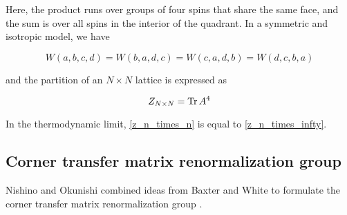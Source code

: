 Here, the product runs over groups of four spins that share the same face, and
the sum is over all spins in the interior of the quadrant.
In a symmetric and isotropic model, we have

\begin{equation}
  W(a, b, c, d) = W(b, a, d, c) = W(c, a, d, b) = W(d, c, b, a)
\end{equation}

and the partition of an $N \times N$ lattice is expressed as

\begin{equation}\label{z_n_times_n}
  Z_{N \times N} = \operatorname{Tr} A^4
\end{equation}

In the thermodynamic limit, \eqref{z_n_times_n} is equal to \eqref{z_n_times_infty}.



\subsection{Corner transfer matrix renormalization group}

Nishino and Okunishi combined ideas from Baxter and White to formulate the
corner transfer matrix renormalization group \cite{nishino1996corner}.
